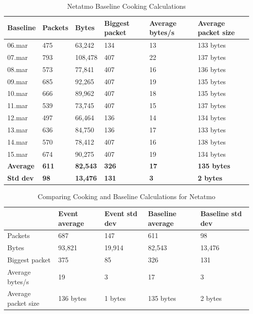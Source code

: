 \begin{table}[!ht]
    \centering
    \caption{Netatmo Baseline Cooking Calculations}
    \begin{tabular}{|l|l|l|l|l|l|}
    \hline
        \textbf{Baseline} & \textbf{Packets} & \textbf{Bytes} & \textbf{Biggest packet} & \textbf{Average bytes/s} & \textbf{Average packet size} \\ \hline
        06.mar & 475 & 63,242 & 134 & 13 & 133 bytes\\ \hline
        07.mar & 793 & 108,478 & 407 & 22 & 137 bytes\\ \hline
        08.mar & 573 & 77,841 & 407 & 16 & 136 bytes \\ \hline
        09.mar & 685 & 92,265 & 407 & 19 & 135 bytes \\ \hline
        10.mar & 666 & 89,962 & 407 & 18 & 135 bytes \\ \hline
        11.mar & 539 & 73,745 & 407 & 15 & 137 bytes \\ \hline
        12.mar & 497 & 66,464 & 136 & 14 & 134 bytes \\ \hline
        13.mar & 636 & 84,750 & 136 & 17 & 133 bytes \\ \hline
        14.mar & 570 & 78,412 & 407 & 16 & 138 bytes \\ \hline
        15.mar & 674 & 90,275 & 407 & 19 & 134 bytes \\ \hline
        \textbf{Average} &  \textbf{611}  &  \textbf{82,543}  &  \textbf{326}  &  \textbf{17}  &  \textbf{135 bytes}  \\ \hline
        \textbf{Std dev}  &  \textbf{98}   &  \textbf{13,476}   &  \textbf{131}   &  \textbf{3}   &  \textbf{2 bytes}   \\ \hline
    \end{tabular}
    \label{tab:NetatmoBaselineCookingCalculations}
\end{table}

\begin{table}[H]
    \centering
    \caption{Comparing Cooking and Baseline Calculations for Netatmo}
    \begin{tabular}{|l|l|l|l|l|}
    \hline
        \textbf{} & \textbf{Event average} & \textbf{Event std dev} & \textbf{Baseline average} & \textbf{Baseline std dev} \\ \hline
        Packets  &  687  &  147   &  611  &  98  \\ \hline
        Bytes  &  93,821  &  19,914   &  82,543  &  13,476   \\ \hline
        Biggest packet  &  375  &  85   &  326  &  131   \\ \hline
        Average bytes/s  &  19  &  3   &  17  &  3   \\ \hline
        Average packet size  &  136 bytes  &  1 bytes  &  135 bytes &  2 bytes  \\ \hline
    \end{tabular}
    \label{tab:NetatmoComparingBaselineAndCookingCalculations}
\end{table}

